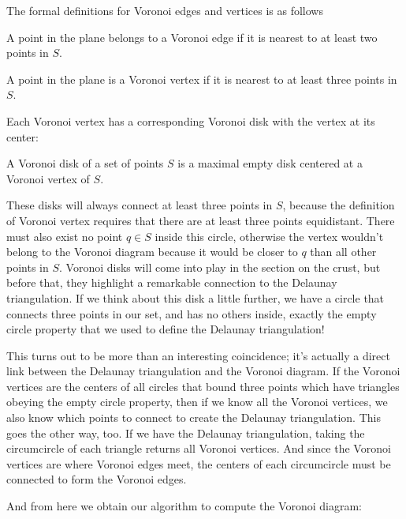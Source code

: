 The formal definitions for Voronoi edges and vertices is as follows
\begin{definition}
	A point in the plane belongs to a Voronoi edge if it is nearest to at least two points in $S$.

	A point in the plane is a Voronoi vertex if it is nearest to at least three points in $S$.
\end{definition}

Each Voronoi vertex has a corresponding Voronoi disk with the vertex at its center:
\begin{definition}
	A Voronoi disk of a set of points $S$ is a maximal empty disk centered at a Voronoi vertex of $S$.
\end{definition}
These disks will always connect at least three points in $S$, because the definition of Voronoi vertex requires that there are at least three points equidistant.
There must also exist no point $q\in S$ inside this circle, otherwise the vertex wouldn't belong to the Voronoi diagram because it would be closer to $q$ than all other points in $S$.
Voronoi disks will come into play in the section on the crust, but before that, they highlight a remarkable connection to the Delaunay triangulation.
If we think about this disk a little further, we have a circle that connects three points in our set, and has no others inside, exactly the empty circle property that we used to define the Delaunay triangulation!

This turns out to be more than an interesting coincidence; it's actually a direct link between the Delaunay triangulation and the Voronoi diagram.
If the Voronoi vertices are the centers of all circles that bound three points which have triangles obeying the empty circle property, then if we know all the Voronoi vertices, we also know which points to connect to create the Delaunay triangulation.
This goes the other way, too.
If we have the Delaunay triangulation, taking the circumcircle of each triangle returns all Voronoi vertices.
And since the Voronoi vertices are where Voronoi edges meet, the centers of each circumcircle must be connected to form the Voronoi edges.

And from here we obtain our algorithm to compute the Voronoi diagram:

\begin{algorithm}
\end{algorithm}

